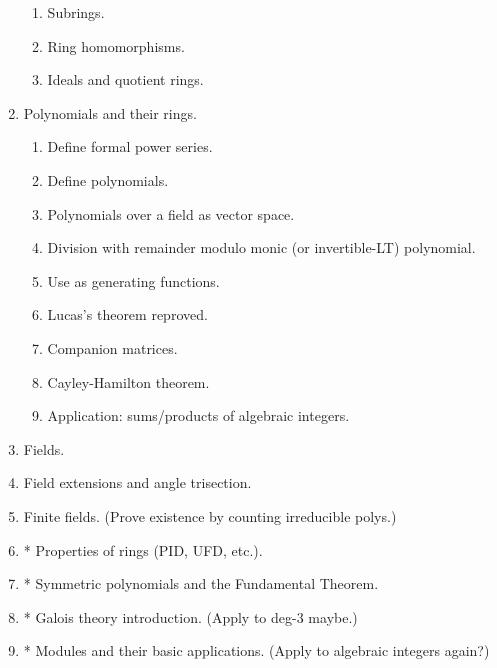 \documentclass[numbers=enddot,12pt,final,onecolumn,notitlepage]{scrartcl}%
\theoremstyle{definition}
\begin{document}
\begin{enumerate}
\begin{enumerate}
\item Subrings.

\item Ring homomorphisms.

\item Ideals and quotient rings.
\end{enumerate}

\item Polynomials and their rings.

\begin{enumerate}
\item Define formal power series.

\item Define polynomials.

\item Polynomials over a field as vector space.

\item Division with remainder modulo monic (or invertible-LT) polynomial.

\item Use as generating functions.

\item Lucas's theorem reproved.

\item Companion matrices.

\item Cayley-Hamilton theorem.

\item Application: sums/products of algebraic integers.
\end{enumerate}

\item Fields.

\item Field extensions and angle trisection.

\item Finite fields. (Prove existence by counting irreducible polys.)

\item * Properties of rings (PID, UFD, etc.).

\item * Symmetric polynomials and the Fundamental Theorem.

\item * Galois theory introduction. (Apply to deg-$3$ maybe.)

\item * Modules and their basic applications. (Apply to algebraic integers again?)
\end{enumerate}
\end{document}
